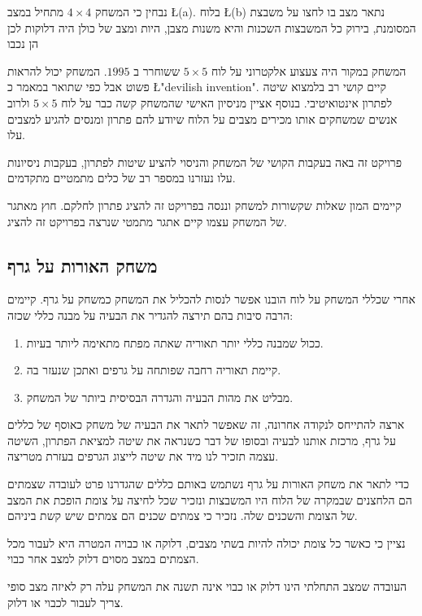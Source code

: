 \documentclass[12pt,twoside]{article}
\begin{document}
נבחין כי המשחק 
$4 \times 4$
מתחיל במצב
\L{(a)}.
בלוח 
\L{(b)}
נתאר מצב בו לחצו על משבצת המסומנת, בירוק
כל המשבצות השכנות והיא משנות מצבן, היות ומצב של כולן היה דלוקות לכן הן נכבו

המשחק במקור היה צעצוע אלקטרוני על לוח 
$5 \times 5$
ששוחרר ב 
$1995$.
המשחק יכול להראות פשוט אבל כפי שתואר
במאמר
\cite{B1}
כ
\L{"devilish invention"}.
קיים קושי רב בלמצוא שיטה לפתרון אינטואיטיבי.
בנוסף אציין מניסיון האישי שהמשחק קשה כבר 
על לוח 
$5 \times 5$
ולרוב אנשים שמשחקים אותו מכירים מצבים על הלוח שיודע להם פתרון ומנסים להגיע למצבים עלו.

פרויקט זה באה בעקבות הקושי של המשחק
והניסוי להציע שיטות לפתרון, בעקבות ניסיונות עלו
נעזרנו במספר רב של כלים מתמטיים מתקדמים.

קיימים המון שאלות שקשורות למשחק וננסה בפרויקט זה להציג פתרון לחלקם.
חוץ מאתגר של המשחק עצמו קיים אתגר מתמטי שנרצה בפרויקט זה להציג.

\subsection{ משחק האורות על גרף}
אחרי שכללי המשחק על לוח הובנו אפשר לנסות להכליל את המשחק כמשחק על גרף.
קיימים הרבה סיבות בהם תירצה להגדיר את הבעיה על מבנה כללי שכזה:

\begin{enumerate}
    \item 
    ככול שמבנה כללי יותר תאוריה שאתה מפתח מתאימה ליותר בעיות.
    \item 
    קיימת תאוריה רחבה שפותחה על גרפים ואתכן שנעזר בה.
    \item 
    מבליט את מהות הבעיה והגדרה הבסיסית ביותר של המשחק.
\end{enumerate}

ארצה להתייחס לנקודה אחרונה, זה שאפשר לתאר את הבעיה של משחק
כאוסף של כללים על גרף, מרכזת אותנו לבעיה ובסופו של דבר כשנראה את שיטה למציאת
הפתרון, השיטה עצמה תזכיר לנו מיד את שיטה לייצוג הגרפים בעזרת מטריצה.

כדי לתאר את משחק האורות על גרף נשתמש באותם כללים שהגדרנו פרט לעובדה
שצמתים הם הלחצנים שבמקרה של הלוח היו המשבצות
ונזכיר שכל לחיצה על צומת הופכת את המצב של הצומת והשכנים שלה.
נזכיר כי צמתים שכנים הם צמתים שיש
קשת ביניהם.

נציין כי כאשר כל צומת יכולה להיות בשתי מצבים,
דלוקה או כבויה המטרה היא לעבור מכל הצמתים במצב מסוים דלוק למצב אחר כבוי.

העובדה שמצב התחלתי הינו דלוק או כבוי אינה תשנה את המשחק עלה רק לאיזה מצב סופי צריך לעבור
לכבוי או דלוק.
\end{document}
